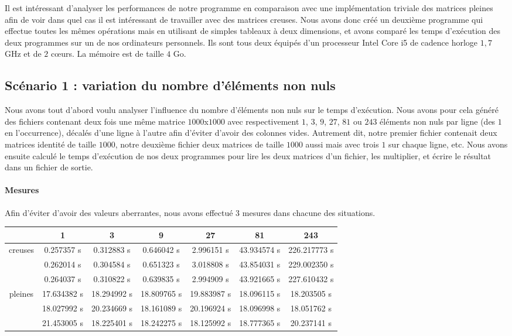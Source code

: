 \documentclass[12pt,a4paper]{article}
\begin{document}
Il est intéressant d'analyser les performances de notre programme en comparaison avec une implémentation triviale des matrices pleines afin de voir dans quel cas il est intéressant de travailler avec des matrices creuses. Nous avons donc créé un deuxième programme qui effectue toutes les mêmes opérations mais en utilisant de simples tableaux à deux dimensions, et avons comparé les temps d'exécution des deux programmes sur un de nos ordinateurs personnels. Ils sont tous deux équipés d'un processeur Intel Core i5 de cadence horloge $1,7$ GHz et de $2$ c\oe urs. La mémoire est de taille $4$ Go.

\subsection{Scénario 1 : variation du nombre d'éléments non nuls}

Nous avons tout d'abord voulu analyser l'influence du nombre d'éléments non nuls sur le temps d'exécution. Nous avons pour cela généré des fichiers contenant deux fois une même matrice $1000$x$1000$ avec respectivement $1$, $3$, $9$, $27$, $81$ ou $243$ éléments non nuls par ligne (des $1$ en l'occurrence), décalés d'une ligne à l'autre afin d'éviter d'avoir des colonnes vides. Autrement dit, notre premier fichier contenait deux matrices identité de taille $1000$, notre deuxième fichier deux matrices de taille $1000$ aussi mais avec trois $1$ sur chaque ligne, etc. Nous avons ensuite calculé le temps d'exécution de nos deux programmes pour lire les deux matrices d'un fichier, les multiplier, et écrire le résultat dans un fichier de sortie. 

\paragraph{Mesures}
Afin d'éviter d'avoir des valeurs aberrantes, nous avons effectué 3 mesures dans chacune des situations. \\

\begin{tabular}{|*{7}{c|}}
    \hline
       & 1  & 3  & 9  & 27  & 81  & 243 \\
    \hline
    \multirow{3}{*}{creuses}  & 0.257357 s & 0.312883 s & 0.646042 s & 2.996151 s & 43.934574 s & 226.217773 s\\
    & 0.262014 s & 0.304584 s & 0.651323 s & 3.018808 s & 43.854031 s & 229.002350 s\\
    & 0.264037 s & 0.310822 s & 0.639835 s & 2.994909 s & 43.921665 s & 227.610432 s\\
    \hline
     \multirow{3}{*}{pleines} & 17.634382 s & 18.294992 s & 18.809765 s  & 19.883987 s & 18.096115 s & 18.203505 s\\
    & 18.027992 s & 20.234669 s & 18.161089 s & 20.196924 s & 18.096998 s & 18.051762 s\\
    & 21.453005 s & 18.225401 s & 18.242275 s & 18.125992 s & 18.777365 s & 20.237141 s\\
    \hline
\end{tabular}
\end{document}
